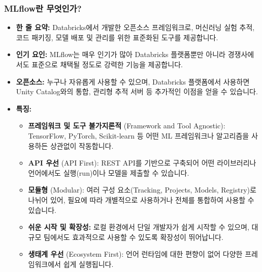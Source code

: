 \documentclass[11pt,a4paper]{article}
\theoremstyle{definition}
\begin{document}
\subsubsection*{MLflow란 무엇인가?}
\begin{itemize}
    \item \textbf{한 줄 요약:} Databricks에서 개발한 오픈소스 프레임워크로, 머신러닝 실험 추적, 코드 패키징, 모델 배포 및 관리를 위한 표준화된 도구를 제공합니다.
    \item \textbf{인기 요인:} MLflow는 매우 인기가 많아 Databricks 플랫폼뿐만 아니라 경쟁사에서도 표준으로 채택될 정도로 강력한 기능을 제공합니다.
    \item \textbf{오픈소스:} 누구나 자유롭게 사용할 수 있으며, Databricks 플랫폼에서 사용하면 Unity Catalog와의 통합, 관리형 추적 서버 등 추가적인 이점을 얻을 수 있습니다.
    \item \textbf{특징:}
    \begin{itemize}
        \item \textbf{프레임워크 및 도구 불가지론적} (Framework and Tool Agnostic): TensorFlow, PyTorch, Scikit-learn 등 어떤 ML 프레임워크나 알고리즘을 사용하든 상관없이 작동합니다.
        \item \textbf{API 우선} (API First): REST API를 기반으로 구축되어 어떤 라이브러리나 언어에서도 실행(run)이나 모델을 제출할 수 있습니다.
        \item \textbf{모듈형} (Modular): 여러 구성 요소(Tracking, Projects, Models, Registry)로 나뉘어 있어, 필요에 따라 개별적으로 사용하거나 전체를 통합하여 사용할 수 있습니다.
        \item \textbf{쉬운 시작 및 확장성:} 로컬 환경에서 단일 개발자가 쉽게 시작할 수 있으며, 대규모 팀에서도 효과적으로 사용할 수 있도록 확장성이 뛰어납니다.
        \item \textbf{생태계 우선} (Ecosystem First): 언어 런타임에 대한 편향이 없어 다양한 프레임워크에서 쉽게 실행됩니다.
    \end{itemize}
\end{itemize}
\end{document}
